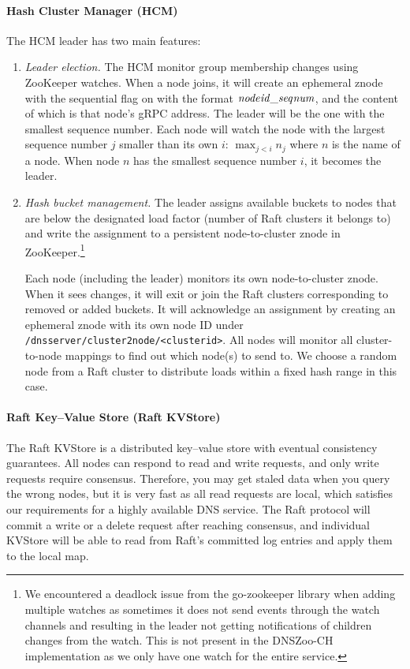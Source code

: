 \documentclass[format=sigconf,nonacm,screen]{acmart}
\newcommand{\dnszooch}{\textsf{DNSZoo-CH}}
\begin{document}
\paragraph{\textbf{Hash Cluster Manager (HCM)}} The HCM leader has two main features:
\begin{enumerate}
    \item \emph{Leader election.} The HCM monitor group membership changes using ZooKeeper watches. When a node joins, it will create an ephemeral znode with the sequential flag on with the format $\mathit{node\-id}\_\allowbreak\mathit{seq\-num}$, and the content of which is that node's gRPC address. The leader will be the one with the smallest sequence number. Each node will watch the node with the largest sequence number $j$ smaller than its own $i$: $\max_{j < i} n_j$ where $n$ is the name of a node. When node $n$ has the smallest sequence number $i$, it becomes the leader.
    \item \emph{Hash bucket management.} The leader assigns available buckets to nodes that are below the designated load factor (number of Raft clusters it belongs to) and write the assignment to a persistent node-to-cluster znode in ZooKeeper.\footnote{We encountered a deadlock issue from the go-zookeeper library when adding multiple watches as sometimes it does not send events through the watch channels and resulting in the leader not getting notifications of children changes from the watch. This is not present in the \dnszooch{} implementation as we only have one watch for the entire service.}
    
    Each node (including the leader) monitors its own node-to-cluster znode. When it sees changes, it will exit or join the Raft clusters corresponding to removed or added buckets. It will acknowledge an assignment by creating an ephemeral znode with its own node ID under \texttt{/dns\-server/\allowbreak{}cluster2\-node/\allowbreak{}<cluster\-id>}.
    All nodes will monitor all cluster-to-node mappings to find out which node(s) to send to. We choose a random node from a Raft cluster to distribute loads within a fixed hash range in this case.
\end{enumerate}

\paragraph{\textbf{Raft Key--Value Store (Raft KVStore)}} The Raft KVStore is a distributed key--value store with eventual consistency guarantees. All nodes can respond to read and write requests, and only write requests require consensus. Therefore, you may get staled data when you query the wrong nodes, but it is very fast as all read requests are local, which satisfies our requirements for a highly available DNS service. The Raft protocol will commit a write or a delete request after reaching consensus, and individual KVStore will be able to read from Raft's committed log entries and apply them to the local map.
\end{document}
